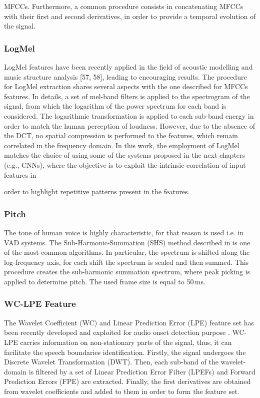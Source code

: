 MFCCs. Furthermore, a common procedure consists in concatenating MFCCs
with their first and second derivatives, in order to provide a temporal evolution
of the signal.

\subsubsection{LogMel}

LogMel features have been recently applied in the field of acoustic modelling
and music structure analysis [57, 58], leading to encouraging results. The procedure for LogMel extraction shares several aspects with the one described
for MFCCs features. In details, a set of mel-band filters is applied to the
spectrogram of the signal, from which the logarithm of the power spectrum
for each band is considered. The logarithmic transformation is applied to each sub-band energy in order to match the human perception of loudness.
However, due to the absence of the DCT, no
spatial compression is performed to the features, which remain correlated in
the frequency domain. In this work, the employment of LogMel matches the
choice of using some of the systems proposed in the next chapters (e.g., CNNs),
where the objective is to exploit the intrinsic correlation of input features in

order to highlight repetitive patterns present in the features.

\subsubsection{Pitch}
The tone of human voice is highly characteristic, for that reason is used i.e. in VAD systems. The Sub-Harmonic-Summation (SHS) method described in \cite{hermes1988measurement} is one of the most common algorithms. In particular, the spectrum is shifted along the log-frequency axis, for each shift the spectrum is scaled and then summed. This procedure creates the sub-harmonic summation spectrum, where peak picking is applied to determine pitch. The used frame size is equal to 50\,ms.


\subsubsection{WC-LPE Feature}
The Wavelet Coefficient (WC) and Linear Prediction Error (LPE) feature set has been recently developed and exploited for audio onset detection purpose \cite{marchi2014multi}. WC-LPE carries information on non-stationary parts of the signal, thus, it can facilitate the speech boundaries identification.
Firstly, the signal undergoes the Discrete Wavelet Transformation (DWT). Then, each sub-band of the wavelet-domain is filtered by a set of Linear Prediction Error Filter (LPEFs) and Forward Prediction Errors (FPE) are extracted. Finally, the first derivatives are obtained from wavelet coefficients and added to them in order to form the feature set.



